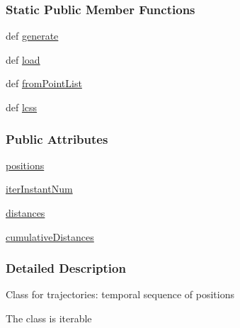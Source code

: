 \subsubsection*{Static Public Member Functions}
\begin{DoxyCompactItemize}
\item 
def \hyperlink{classmoving_1_1Trajectory_a8f8d9351483c047ef6fc1acab71d74f8}{generate}
\item 
def \hyperlink{classmoving_1_1Trajectory_a495adc18cf5fbd791dc9526f2724fd22}{load}
\item 
def \hyperlink{classmoving_1_1Trajectory_a98b8b718e483b273baaf63b221f9c703}{from\-Point\-List}
\item 
def \hyperlink{classmoving_1_1Trajectory_a8b3729a2f240a6af031aab28bd2811e0}{lcss}
\end{DoxyCompactItemize}
\subsubsection*{Public Attributes}
\begin{DoxyCompactItemize}
\item 
\hyperlink{classmoving_1_1Trajectory_ab6697c53341abdd8ceedf922a014a35a}{positions}
\item 
\hyperlink{classmoving_1_1Trajectory_afd8c6444a6674ebc78e365bd5fe3d9dc}{iter\-Instant\-Num}
\item 
\hyperlink{classmoving_1_1Trajectory_aea4fefdcb7befe82e5c301da11897e74}{distances}
\item 
\hyperlink{classmoving_1_1Trajectory_a9546b3c74eb9958e3e0ed1f6389975ce}{cumulative\-Distances}
\end{DoxyCompactItemize}


\subsubsection{Detailed Description}
\begin{DoxyVerb}Class for trajectories: temporal sequence of positions

The class is iterable\end{DoxyVerb}
 

